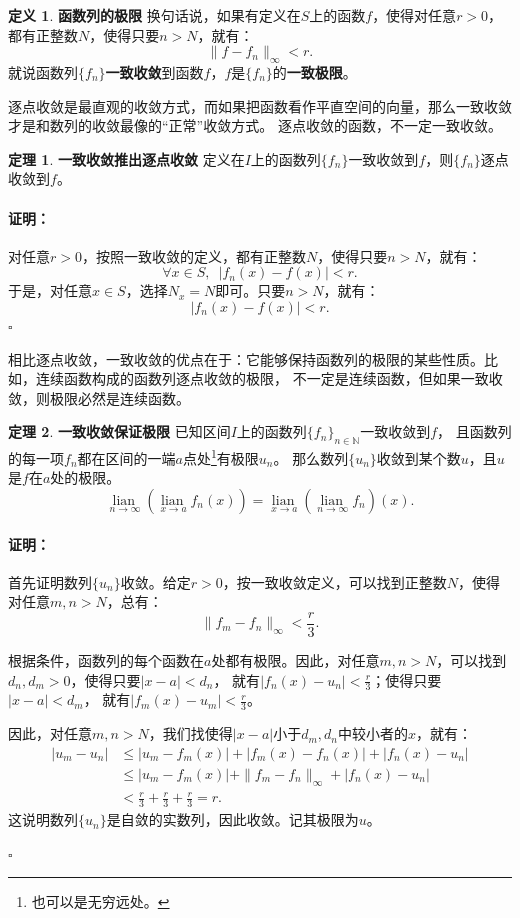 \documentclass[12pt,UTF8]{ctexbook}
\newcommand{\lian}[1]{
    \underset{#1}{\operatorname{lian}\,}
}
\theoremstyle{definition}
\newtheorem{df}{定义}[section]
\newtheorem{tm}{定理}[section]
\theoremstyle{plain}
\renewenvironment{proof}{\paragraph{\textbf{证明：}}}{\hfill$\square$}
\begin{document}
\begin{appendix}
\begin{df}{\textbf{函数列的极限}}
    换句话说，如果有定义在$S$上的函数$f$，使得对任意$r>0$，都有正整数$N$，使得只要$n>N$，就有：
    $$ \| f - f_n \|_{\infty} < r.$$
    就说函数列$\{f_n\}$\textbf{一致收敛}到函数$f$，$f$是$\{f_n\}$的\textbf{一致极限}。
\end{df}

逐点收敛是最直观的收敛方式，而如果把函数看作平直空间的向量，那么一致收敛才是和数列的收敛最像的“正常”收敛方式。
逐点收敛的函数，不一定一致收敛。

\begin{tm}{\textbf{一致收敛推出逐点收敛}}
    定义在$I$上的函数列$\{f_n\}$一致收敛到$f$，则$\{f_n\}$逐点收敛到$f$。
\end{tm}

\begin{proof}
    对任意$r>0$，按照一致收敛的定义，都有正整数$N$，使得只要$n>N$，就有：
    $$ \forall x\in S, \,\,\,|f_n(x) - f(x) | < r.$$
    于是，对任意$x\in S$，选择$N_x = N$即可。只要$n>N$，就有：
    $$ |f_n(x) - f(x) | < r.$$
\end{proof}

相比逐点收敛，一致收敛的优点在于：它能够保持函数列的极限的某些性质。比如，连续函数构成的函数列逐点收敛的极限，
不一定是连续函数，但如果一致收敛，则极限必然是连续函数。

\begin{tm}{\textbf{一致收敛保证极限}}
    已知区间$I$上的函数列$\{f_n\}_{n\in\mathbb{N}}$一致收敛到$f$，
    且函数列的每一项$f_n$都在区间的一端$a$点处\footnote{也可以是无穷远处。}有极限$u_n$。
    那么数列$\{u_n\}$收敛到某个数$u$，且$u$是$f$在$a$处的极限。
    $$ \lian{n\to \infty} \left(\lian{x\to a} f_n(x) \right) = \lian{x\to a} \left(\lian{n\to \infty} f_n\right)(x). $$
\end{tm}

\begin{proof}
    首先证明数列$\{u_n\}$收敛。给定$r>0$，按一致收敛定义，可以找到正整数$N$，使得对任意$m,n>N$，总有：
    $$ \| f_m - f_n\|_{\infty} < \frac{r}{3}.$$

    根据条件，函数列的每个函数在$a$处都有极限。因此，对任意$m,n>N$，可以找到$d_n, d_m > 0$，使得只要$|x - a| < d_n$，
    就有$|f_n(x) - u_n| < \frac{r}{3}$；使得只要$|x - a| < d_m$，
    就有$|f_m(x) - u_m| < \frac{r}{3}$。

    因此，对任意$m,n>N$，我们找使得$|x - a|$小于$d_m, d_n$中较小者的$x$，就有：
    \begin{align*}
        |u_m - u_n| &\leqslant |u_m - f_m(x)| + |f_m(x) - f_n(x)| + |f_n(x) - u_n| \\
        &\leqslant |u_m - f_m(x)| + \| f_m - f_n\|_{\infty} + |f_n(x) - u_n| \\
        &< \frac{r}{3} + \frac{r}{3} + \frac{r}{3} = r.
    \end{align*}
    这说明数列$\{u_n\}$是自敛的实数列，因此收敛。记其极限为$u$。


\end{proof}
\end{appendix}
\end{document}
